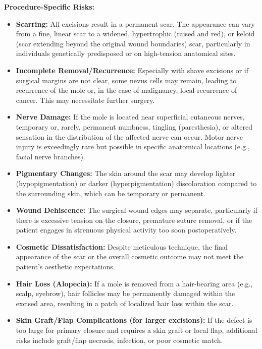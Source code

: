 \textbf{Procedure-Specific Risks:}

\begin{itemize}
  \item \textbf{Scarring:} All excisions result in a permanent scar. The appearance can vary from a fine, linear scar to a widened, hypertrophic (raised and red), or keloid (scar extending beyond the original wound boundaries) scar, particularly in individuals genetically predisposed or on high-tension anatomical sites.
  
  \item \textbf{Incomplete Removal/Recurrence:} Especially with shave excisions or if surgical margins are not clear, some nevus cells may remain, leading to recurrence of the mole or, in the case of malignancy, local recurrence of cancer. This may necessitate further surgery.
  
  \item \textbf{Nerve Damage:} If the mole is located near superficial cutaneous nerves, temporary or, rarely, permanent numbness, tingling (paresthesia), or altered sensation in the distribution of the affected nerve can occur. Motor nerve injury is exceedingly rare but possible in specific anatomical locations (e.g., facial nerve branches).
  
  \item \textbf{Pigmentary Changes:} The skin around the scar may develop lighter (hypopigmentation) or darker (hyperpigmentation) discoloration compared to the surrounding skin, which can be temporary or permanent.
  
  \item \textbf{Wound Dehiscence:} The surgical wound edges may separate, particularly if there is excessive tension on the closure, premature suture removal, or if the patient engages in strenuous physical activity too soon postoperatively.
  
  \item \textbf{Cosmetic Dissatisfaction:} Despite meticulous technique, the final appearance of the scar or the overall cosmetic outcome may not meet the patient's aesthetic expectations.
  
  \item \textbf{Hair Loss (Alopecia):} If a mole is removed from a hair-bearing area (e.g., scalp, eyebrow), hair follicles may be permanently damaged within the excised area, resulting in a patch of localized hair loss within the scar.
  
  \item \textbf{Skin Graft/Flap Complications (for larger excisions):} If the defect is too large for primary closure and requires a skin graft or local flap, additional risks include graft/flap necrosis, infection, or poor cosmetic match.
\end{itemize}

